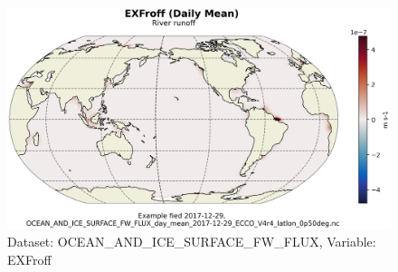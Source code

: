 \begin{figure}[H]
\centering
\includegraphics[scale=0.55]{../images/plots/latlon_plots/Ocean_and_Sea-Ice_Surface_Freshwater_Fluxes/EXFroff.png}
\caption{Dataset: OCEAN\_AND\_ICE\_SURFACE\_FW\_FLUX, Variable: EXFroff}
\label{tab:table-OCEAN_AND_ICE_SURFACE_FW_FLUX_EXFroff-Plot}
\end{figure}
\pagebreak
